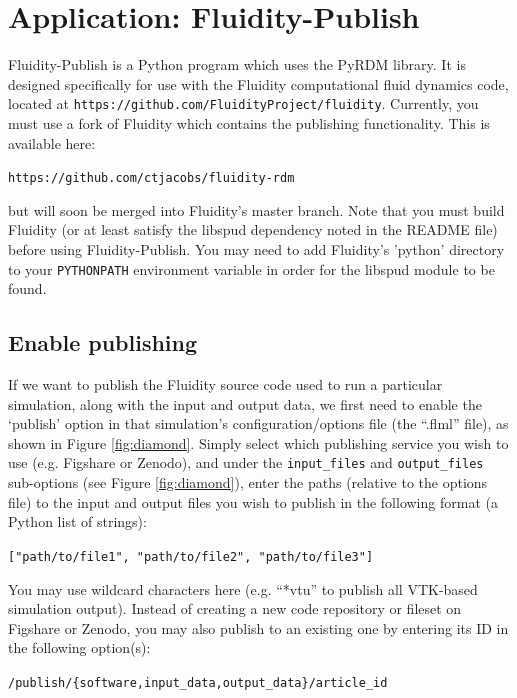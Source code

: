 \documentclass[a4paper,11pt]{report}
\begin{document}
\chapter{Application: Fluidity-Publish}
Fluidity-Publish is a Python program which uses the PyRDM library. It is designed specifically for use with the Fluidity computational fluid dynamics code, located at \texttt{https://github.com/FluidityProject/fluidity}. Currently, you must use a fork of Fluidity which contains the publishing functionality. This is available here:

\texttt{https://github.com/ctjacobs/fluidity-rdm}

but will soon be merged into Fluidity's master branch. Note that you must build Fluidity (or at least satisfy the libspud dependency noted in the README file) before using Fluidity-Publish. You may need to add Fluidity's 'python' directory to your \texttt{PYTHONPATH} environment variable in order for the libspud module to be found.

\section{Enable publishing}
If we want to publish the Fluidity source code used to run a particular simulation, along with the input and output data, we first need to enable the `publish' option in that simulation's configuration/options file (the ``.flml'' file), as shown in Figure \ref{fig:diamond}. Simply select which publishing service you wish to use (e.g. Figshare or Zenodo), and under the \texttt{input\_files} and \texttt{output\_files} sub-options (see Figure \ref{fig:diamond}), enter the paths (relative to the options file) to the input and output files you wish to publish in the following format (a Python list of strings): 

\texttt{["path/to/file1", "path/to/file2", "path/to/file3"]}

You may use wildcard characters here (e.g. ``*vtu'' to publish all VTK-based simulation output). Instead of creating a new code repository or fileset on Figshare or Zenodo, you may also publish to an existing one by entering its ID in the following option(s):

\texttt{/publish/\{software,input\_data,output\_data\}/article\_id}
\end{document}
